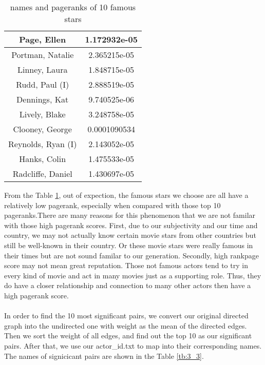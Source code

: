 \documentclass{article}
\begin{document}
\begin {table}[htbp]
\caption{names and pageranks of 10 famous stars}
\begin{adjustbox}{center}
\label{tb:3_2}
\begin{tabular}{|c|c|}
\hline
Page, Ellen &  1.172932e-05\\
\hline
Portman, Natalie & 2.365215e-05 \\
\hline
Linney, Laura & 1.848715e-05 \\
\hline
Rudd, Paul (I) & 2.888519e-05 \\
\hline
Dennings, Kat & 9.740525e-06 \\
\hline
Lively, Blake & 3.248758e-05 \\
\hline
Clooney, George & 0.0001090534 \\
\hline
Reynolds, Ryan (I) & 2.143052e-05 \\
\hline
Hanks, Colin & 1.475533e-05 \\
\hline
Radcliffe, Daniel & 1.430697e-05 \\
\hline
\end{tabular}
\end{adjustbox}
\end{table}
From the Table \ref{tb:3_2}, out of expection, the famous stars we choose are all have a relatively low pagerank, especially when compared with those top 10 pageranks.There are many reasons for this phenomenon that we are not familar with those high pagerank scores. First, due to our subjectivity and our time and country, we may not actually know certain movie stars from other countries but still be well-known in their country. Or these movie stars were really famous in their times but are not sound familar to our generation. Secondly, high rankpage score may not mean great reputation. Those not famous actors tend to try in every kind of movie and act in many movies just as a supporting role. Thus, they do have a closer relationship and connection to many other actors then have a high pagerank score. \\
\\In order to find the 10 most significant pairs, we convert our original directed graph into the undirected one with weight as the mean of the directed edges. Then we sort the weight of all edges, and find out the top 10 as our significant pairs. After that, we use our actor\_id.txt to map into their corresponding names. The names of signicicant pairs are shown in the Table \ref{tb:3_3}.
\end{document}
